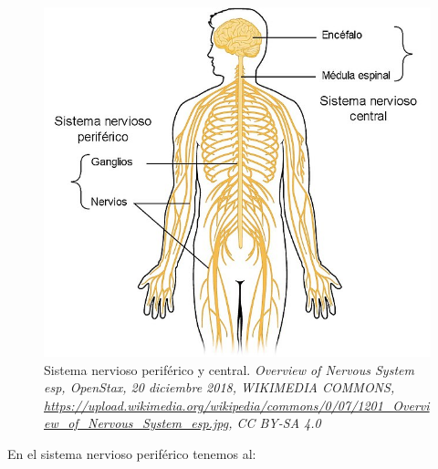 \begin{figure}[h]
 \centering
 \includegraphics[scale=0.5]{../Figuras/Nervous_System.jpg}
 \caption{Sistema nervioso periférico y central.  \textit{Overview of Nervous System esp, OpenStax, 20 diciembre 2018, WIKIMEDIA COMMONS, \url{https://upload.wikimedia.org/wikipedia/commons/0/07/1201_Overview_of_Nervous_System_esp.jpg}, CC BY-SA 4.0}}
 \label{fig:SNCySNP}
\end{figure}


En el sistema nervioso periférico tenemos al:


